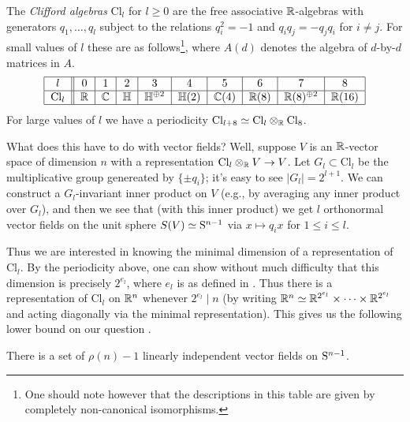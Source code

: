 \newcommand{\Cl}{\mathrm{Cl}}
\newcommand{\HH}{\mathbb{H}}
\begin{nothing}
  \label{clifford}
  The \emph{Clifford algebras} $\Cl_l$ for $l \ge 0$ are the free
  associative $\R$-algebras with generators $q_1,\ldots,q_l$ subject
  to the relations $q_i^2 = -1$ and $q_iq_j = -q_jq_i$ for $i \ne
  j$. For small values of $l$ these are as follows\footnote{One should
    note however that the descriptions in this table are given by
    completely non-canonical isomorphisms.}, where $A(d)$
  denotes the algebra of $d$-by-$d$ matrices in $A$.
  \[
    \begin{tabular}{|c||c|c|c|c|c|c|c|c|c|}
      \hline
      $l$ & 0 & 1 & 2 & 3 & 4 & 5 & 6 & 7 & 8 \\
      \hline
      $\Cl_l$ & $\R$ & $\C$ & $\HH$ & $\HH^{\oplus 2}$ & $\HH(2)$ &
      $\C(4)$ & $\R(8)$ & $\R(8)^{\oplus 2}$ & $\R(16)$ \\
      \hline
    \end{tabular}
  \]
  For large values of $l$ we have a periodicity $\Cl_{l+8} \simeq
  \Cl_l \otimes_\R \Cl_8$.

  What does this have to do with vector fields? Well, suppose $V$ is
  an $\R$-vector space of dimension $n$ with a representation $\Cl_l
  \otimes_\R V \to V$. Let $G_l \subset \Cl_l$ be the multiplicative
  group genereated by $\{\pm q_i\}$; it's easy to see $|G_l| =
  2^{l+1}$. We can construct a $G_l$-invariant inner product on $V$
  (e.g., by averaging any inner product over $G_l$), and then we see
  that (with this inner product) we get $l$ orthonormal vector fields
  on the unit sphere $S(V) \simeq \S^{n-1}$ via $x \mapsto q_ix$ for
  $1 \le i \le l$.

  Thus we are interested in knowing the minimal dimension of a
  representation of $\Cl_l$. By the periodicity above, one can show
  without much difficulty that this dimension is precisely $2^{e_l}$,
  where $e_l$ is as defined in . Thus there is a
  representation of $\Cl_l$ on $\R^n$ whenever $2^{e_l} \mid n$ (by
  writing $\R^n \simeq \R^{2^{e_l}} \times \cdots \times \R^{2^{e_l}}$
  and acting diagonally via the minimal representation). This gives us
  the following lower bound on our question .
\end{nothing}

\begin{theorem}
  \label{vfield-lower-bound}
  There is a set of $\rho(n)-1$ linearly independent vector fields on
  $\S^{n-1}$.
\end{theorem}

